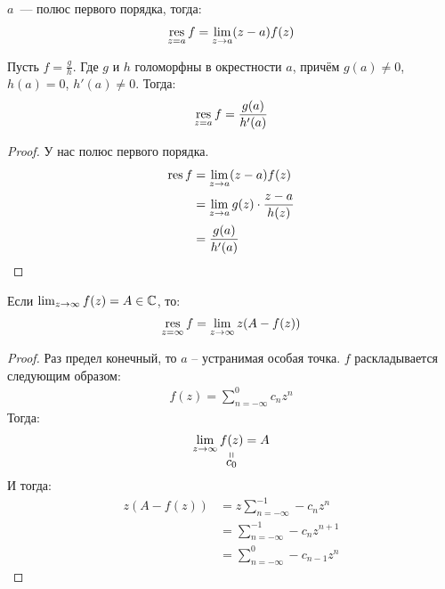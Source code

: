 \begin{property}
    $a$~--- полюс первого порядка, тогда:
    \begin{gather*}
        \res\limits_{z = a} f = \lim_{z\to a} (z-a)f(z)
    \end{gather*}
\end{property}

\begin{property}
    Пусть $f = \frac{g}{h}$.
    Где $g$ и $h$ голоморфны в окрестности $a$, причём
    $g(a) \ne 0$, $h(a) = 0$, $h'(a) \ne 0$.
    Тогда:
    \begin{gather*}
        \res\limits_{z = a} f = \frac{g(a)}{h'(a)}
    \end{gather*}
\end{property}

\begin{proof}
    У нас полюс первого порядка.
    \begin{align*}
        \res f &= \lim_{z\to a} (z-a) f(z) \\ 
        &= \lim_{z\to a} g(z) \cdot \frac{z-a}{h(z)} \\
        &= \frac{g(a)}{h'(a)}
    \end{align*}
\end{proof}

\begin{property}
    Если $\lim_{z\to\infty} f(z) = A \in \C$,
    то:
    \begin{gather*}
        \res\limits_{z=\infty} f = \lim_{z\to\infty} z(A-f(z))
    \end{gather*}
\end{property}

\begin{proof}
    Раз предел конечный, то $a$ -- устранимая особая точка. $f$ раскладывается следующим образом: 
    \begin{gather*}
        f(z) = \sum\limits_{n=-\infty}^{0} c_{n}z^n
    \end{gather*}
    Тогда: 
    \begin{gather*}
        \lim\limits_{z\to\infty} \stackbelow{f(z)}{c_0} = A
    \end{gather*}
    И тогда: 
    \begin{align*}
        z(A-f(z)) &= z\sum\limits_{n=-\infty}^{-1} -c_{n}z^{n} \\ 
         &= \sum\limits_{n=-\infty}^{-1} -c_{n}z^{n+1} \\ 
         &= \sum\limits_{n=-\infty}^{0} -c_{n-1}z^{n}
    \end{align*}
\end{proof}

